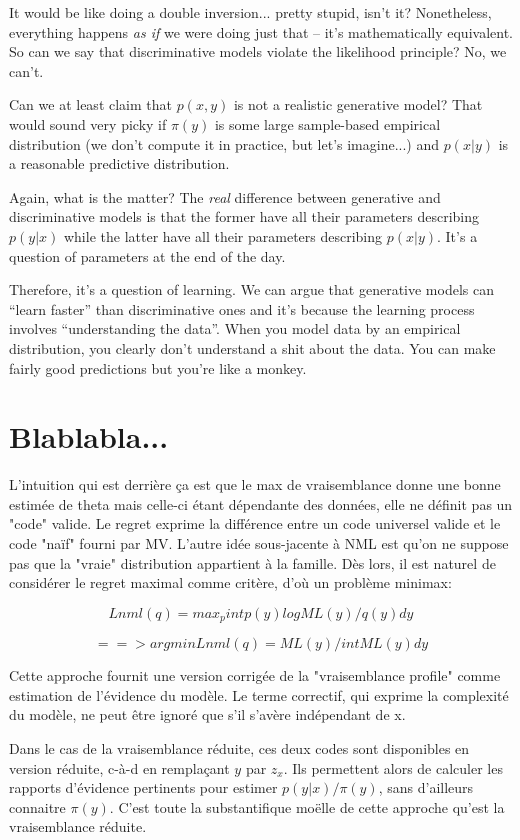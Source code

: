 \documentclass{article}
\begin{document}
It would be like doing a double inversion... pretty stupid, isn't it? Nonetheless, everything happens {\em as if} we were doing just that -- it's mathematically equivalent. So can we say that discriminative models violate the likelihood principle? No, we can't.

Can we at least claim that $p(x,y)$ is not a realistic generative model? That would sound very picky if $\pi(y)$ is some large sample-based empirical distribution (we don't compute it in practice, but let's imagine...) and $p(x|y)$ is a reasonable predictive distribution. 

Again, what is the matter? The {\em real} difference between generative and discriminative models is that the former have all their parameters describing $p(y|x)$ while the latter have all their parameters describing $p(x|y)$. It's a question of parameters at the end of the day.

Therefore, it's a question of learning. We can argue that generative models can ``learn faster'' than discriminative ones and it's because the learning process involves ``understanding the data''. When you model data by an empirical distribution, you clearly don't understand a shit about the data. You can make fairly good predictions but you're like a monkey.



\section{Blablabla...}


L'intuition qui est derri\`ere \c{c}a est que le max de vraisemblance donne une bonne estim\'ee de theta mais celle-ci \'etant d\'ependante des donn\'ees, elle ne d\'efinit pas un "code" valide. Le regret exprime la diff\'erence entre un code universel valide et le code "na\"if" fourni par MV. L'autre id\'ee sous-jacente \`a NML est qu'on ne suppose pas que la "vraie" distribution appartient \`a la famille. D\`es lors, il est naturel de consid\'erer le regret maximal comme crit\`ere, d'o\`u un probl\`eme minimax: 

$$Lnml(q) = max_p int p(y) log ML(y)/q(y) dy$$ 

$$==> argmin Lnml(q) = ML(y) / int ML(y) dy$$ 

Cette approche fournit une version corrig\'ee de la "vraisemblance profile" comme estimation de l'\'evidence du mod\`ele. Le terme correctif, qui exprime la complexit\'e du mod\`ele, ne peut \^etre ignor\'e que s'il s'av\`ere ind\'ependant de x. 

Dans le cas de la vraisemblance r\'eduite, ces deux codes sont disponibles en version r\'eduite, c-\`a-d en rempla\c{c}ant $y$ par $z_x$. Ils permettent alors de calculer les rapports d'\'evidence pertinents pour estimer $p(y|x)/\pi(y)$, sans d'ailleurs connaitre $\pi(y)$. C'est toute la substantifique mo\"elle de cette approche qu'est la vraisemblance r\'eduite. 
\end{document}
